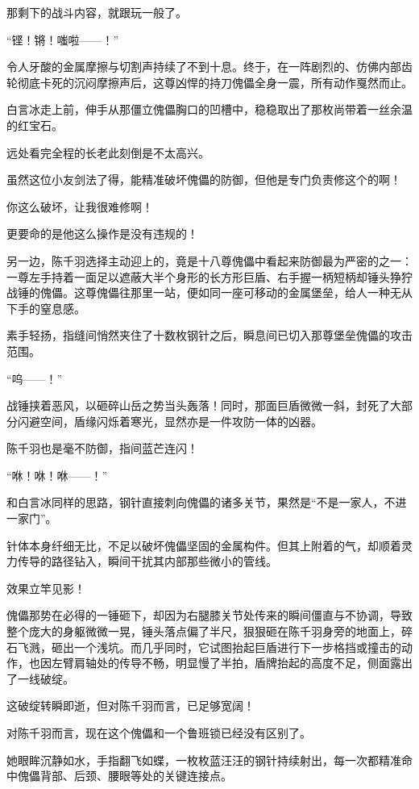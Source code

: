 那剩下的战斗内容，就跟玩一般了。

“铿！锵！嗤啦——！”

令人牙酸的金属摩擦与切割声持续了不到十息。终于，在一阵剧烈的、仿佛内部齿轮彻底卡死的沉闷摩擦声后，这尊凶悍的持刀傀儡全身一震，所有动作戛然而止。

白言冰走上前，伸手从那僵立傀儡胸口的凹槽中，稳稳取出了那枚尚带着一丝余温的红宝石。

远处看完全程的长老此刻倒是不太高兴。

虽然这位小友剑法了得，能精准破坏傀儡的防御，但他是专门负责修这个的啊！

你这么破坏，让我很难修啊！

更要命的是他这么操作是没有违规的！

\vspace{2em}

另一边，陈千羽选择主动迎上的，竟是十八尊傀儡中看起来防御最为严密的之一：一尊左手持着一面足以遮蔽大半个身形的长方形巨盾、右手握一柄短柄却锤头狰狞战锤的傀儡。这尊傀儡往那里一站，便如同一座可移动的金属堡垒，给人一种无从下手的窒息感。

素手轻扬，指缝间悄然夹住了十数枚钢针之后，瞬息间已切入那尊堡垒傀儡的攻击范围。

“呜——！”

战锤挟着恶风，以砸碎山岳之势当头轰落！同时，那面巨盾微微一斜，封死了大部分闪避空间，盾缘闪烁着寒光，显然亦是一件攻防一体的凶器。

陈千羽也是毫不防御，指间蓝芒连闪！

“咻！咻！咻——！”

和白言冰同样的思路，钢针直接刺向傀儡的诸多关节，果然是“不是一家人，不进一家门”。

针体本身纤细无比，不足以破坏傀儡坚固的金属构件。但其上附着的气，却顺着灵力传导的路径钻入，瞬间干扰其内部那些微小的管线。

效果立竿见影！

傀儡那势在必得的一锤砸下，却因为右腿膝关节处传来的瞬间僵直与不协调，导致整个庞大的身躯微微一晃，锤头落点偏了半尺，狠狠砸在陈千羽身旁的地面上，碎石飞溅，砸出一个浅坑。而几乎同时，它试图抬起巨盾进行下一步格挡或撞击的动作，也因左臂肩轴处的传导不畅，明显慢了半拍，盾牌抬起的高度不足，侧面露出了一线破绽。

这破绽转瞬即逝，但对陈千羽而言，已足够宽阔！

对陈千羽而言，现在这个傀儡和一个鲁班锁已经没有区别了。

她眼眸沉静如水，手指翻飞如蝶，一枚枚蓝汪汪的钢针持续射出，每一次都精准命中傀儡背部、后颈、腰眼等处的关键连接点。

